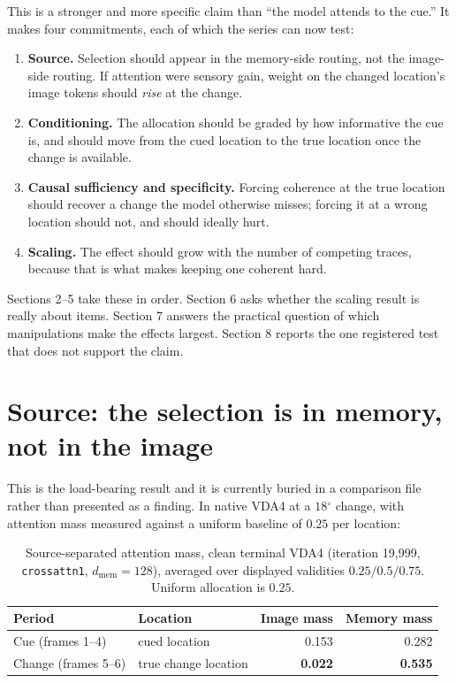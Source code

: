 \documentclass[11pt]{article}
\newcommand{\dg}{\ensuremath{^\circ}}
\begin{document}
\noindent This is a stronger and more specific claim than ``the model attends to the cue.''
It makes four commitments, each of which the series can now test:

\begin{enumerate}[leftmargin=1.6em,itemsep=2pt]
\item \textbf{Source.} Selection should appear in the memory-side routing, not the image-side
routing. If attention were sensory gain, weight on the changed location's image tokens should
\emph{rise} at the change.
\item \textbf{Conditioning.} The allocation should be graded by how informative the cue is,
and should move from the cued location to the true location once the change is available.
\item \textbf{Causal sufficiency and specificity.} Forcing coherence at the true location
should recover a change the model otherwise misses; forcing it at a wrong location should not,
and should ideally hurt.
\item \textbf{Scaling.} The effect should grow with the number of competing traces, because
that is what makes keeping one coherent hard.
\end{enumerate}

Sections 2--5 take these in order. Section 6 asks whether the scaling result is really about
items. Section 7 answers the practical question of which manipulations make the effects
largest. Section 8 reports the one registered test that does not support the claim.

\section{Source: the selection is in memory, not in the image}

This is the load-bearing result and it is currently buried in a comparison file rather than
presented as a finding. In native VDA4 at a $18\dg$ change, with attention mass measured
against a uniform baseline of $0.25$ per location:

\begin{table}[h]
\centering\small
\caption{Source-separated attention mass, clean terminal VDA4 (iteration 19{,}999,
\texttt{crossattn1}, $d_\mathrm{mem}{=}128$), averaged over displayed validities
$0.25/0.5/0.75$. Uniform allocation is $0.25$.}
\label{tab:source}
\begin{tabular}{llrr}
\toprule
Period & Location & Image mass & Memory mass \\
\midrule
Cue (frames 1--4)    & cued location        & 0.153 & 0.282 \\
Change (frames 5--6) & true change location & \textbf{0.022} & \textbf{0.535} \\
\bottomrule
\end{tabular}
\end{table}
\end{document}
